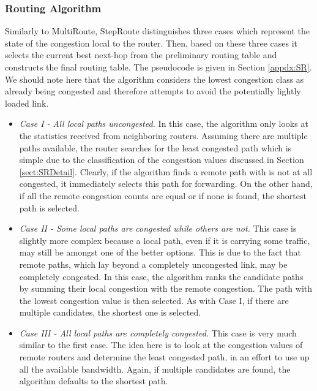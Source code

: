 
\subsubsection{Routing Algorithm}

Similarly to MultiRoute, StepRoute distinguishes three cases which represent the state of the congestion local to the router. Then, based on these three cases it selects the current best next-hop from the preliminary routing table and constructs the final routing table.  The pseudocode is given in Section \ref{appdx:SR}. We should note here that the algorithm considers the lowest congestion class as already being congested and therefore attempts to avoid the potentially lightly loaded link.

\begin{itemize}
 \item \textit{Case I - All local paths uncongested.} In this case, the
algorithm only looks at the statistics received from neighboring routers.
Assuming there are multiple paths available, the router searches for the least
congested path which is simple due to the classification of the congestion
values discussed in Section \ref{sect:SRDetail}. Clearly, if the
algorithm finds a remote path with is not at all congested, it immediately
selects this path for forwarding. On the other hand, if all the remote
congestion counts are equal or if none is found, the shortest path is selected.
 \item \textit{Case II - Some local paths are congested while others are not.}
This case is slightly more complex because a local path, even if it is carrying
some traffic, may still be amongst one of the better options. This is due to
the fact that remote paths, which lay beyond a completely uncongested link, may
be completely congested. In this case, the algorithm ranks the candidate paths
by summing their local congestion with the remote congestion. The path with the
lowest congestion value is then selected. As with Case I, if there are multiple
candidates, the shortest one is selected.
 \item \textit{Case III - All local paths are completely congested.} This case
is very much similar to the first case. The idea here is to look at the
congestion values of remote routers and determine the least congested path, in
an effort to use up all the available bandwidth. Again, if multiple candidates
are found, the algorithm defaults to the shortest path.
\end{itemize}


